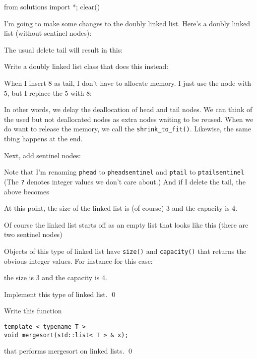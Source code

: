 \begin{python0}
from solutions import *; clear()
\end{python0}

\begin{ex}
I'm going to make some changes to the doubly linked list.
Here's a doubly linked list (without sentinel nodes):



The usual delete tail will result in this:



Write a doubly linked list class that does this instead:



When I insert 8 as tail, I don't have to allocate memory. I just use the node
with 5, but I replace the 5 with 8:



In other words, we delay the deallocation of head and tail nodes.
We can think of the used but not deallocated nodes as extra nodes
waiting to be reused.
When we do want to release the memory, we call the
\verb!shrink_to_fit()!.
Likewise, the same tbing happens at the end.

Next, add sentinel nodes:



Note that I'm renaming \texttt{phead} to 
\texttt{pheadsentinel}
and
\texttt{ptail}
to
\texttt{ptailsentinel}
(The \texttt{?} denotes integer values we don't care about.)
And if I delete the tail, the above becomes



At this point, the size of the linked list is (of course) 3
and the capacity is 4.

Of course the linked list starts off as an empty list
that looks like this (there are two sentinel nodes)



Objects of this type of linked list have
\texttt{size()} and \texttt{capacity()}
that returns the obvious integer values.
For instance for this case:



the size is 3 and the capacity is 4.

Implement this type of linked list.
\qed
\end{ex}


\begin{ex}
Write this function
\begin{Verbatim}[frame=single]
template < typename T >
void mergesort(std::list< T > & x);
\end{Verbatim}
that performs mergesort on linked lists.
\qed
\end{ex}

